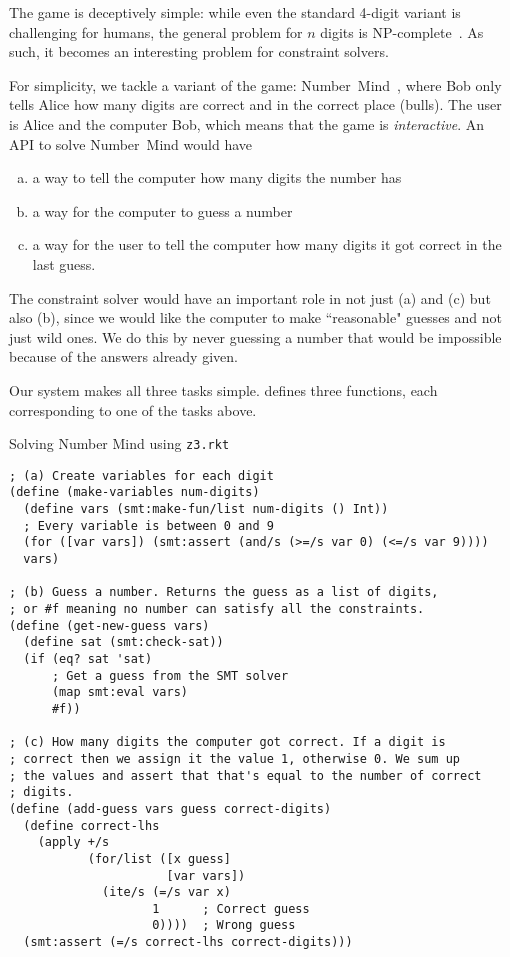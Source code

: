The game is deceptively simple: while even the standard 4-digit variant is
challenging for humans, the general problem for $n$ digits is
NP-complete~\cite{mastermindnpc}. As such, it becomes an interesting problem for
constraint solvers.

For simplicity, we tackle a variant of the game:
Number~Mind~\cite{numbermind}, where Bob only tells Alice how many digits are
correct and in the correct place (bulls). The user is Alice and the computer
Bob, which means that the game is \textit{interactive}. An API to solve
Number~Mind would have

\begin{enumerate}[(a)]
\item a way to tell the computer how many digits the number has
\item a way for the computer to guess a number
\item a way for the user to tell the computer how many digits it got correct
  in the last guess.
\end{enumerate}

The constraint solver would have an important role in not just (a) and (c) but
also (b), since we would like the computer to make ``reasonable" guesses and
not just wild ones. We do this by never guessing a number that would be
impossible because of the answers already given.

Our system makes all three tasks simple.  defines three
functions, each corresponding to one of the tasks above.

\begin{program}
\caption{Solving Number Mind using \texttt{z3.rkt}}
\label{fig:numbermind}
\begin{verbatim}
; (a) Create variables for each digit
(define (make-variables num-digits)
  (define vars (smt:make-fun/list num-digits () Int))
  ; Every variable is between 0 and 9
  (for ([var vars]) (smt:assert (and/s (>=/s var 0) (<=/s var 9))))
  vars)

; (b) Guess a number. Returns the guess as a list of digits,
; or #f meaning no number can satisfy all the constraints.
(define (get-new-guess vars)
  (define sat (smt:check-sat))
  (if (eq? sat 'sat)
      ; Get a guess from the SMT solver
      (map smt:eval vars)
      #f))

; (c) How many digits the computer got correct. If a digit is
; correct then we assign it the value 1, otherwise 0. We sum up
; the values and assert that that's equal to the number of correct
; digits.
(define (add-guess vars guess correct-digits)
  (define correct-lhs
    (apply +/s
           (for/list ([x guess]
                      [var vars])
             (ite/s (=/s var x)
                    1      ; Correct guess
                    0))))  ; Wrong guess
  (smt:assert (=/s correct-lhs correct-digits)))
\end{verbatim}
\end{program}

